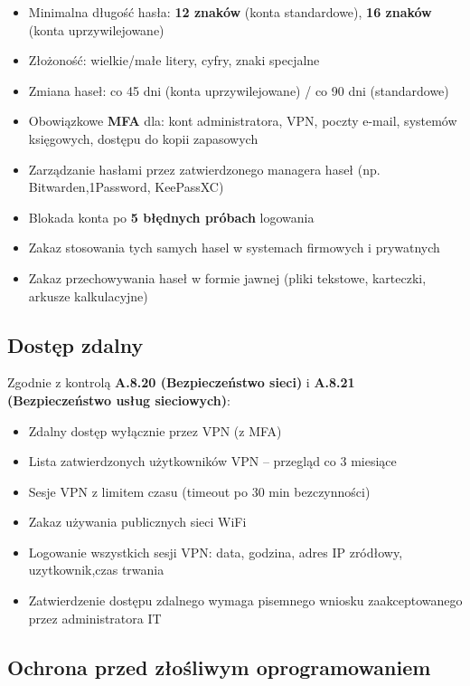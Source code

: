 \documentclass[12pt,a4paper]{article}
\providecommand{\tightlist}{\setlength{\itemsep}{0pt}\setlength{\parskip}{0pt}}
\begin{document}
\begin{itemize}
\tightlist
\item
  Minimalna długość hasła: \textbf{12 znaków} (konta standardowe), \textbf{16 znaków} (konta uprzywilejowane)
\item
  Złożoność: wielkie/małe litery, cyfry, znaki specjalne
\item
  Zmiana haseł: co 45 dni (konta uprzywilejowane) / co 90 dni
  (standardowe)
\item
  Obowiązkowe \textbf{MFA} dla: kont administratora, VPN, poczty e-mail,
  systemów księgowych, dostępu do kopii zapasowych
\item
  Zarządzanie hasłami przez zatwierdzonego managera haseł (np. Bitwarden,1Password, KeePassXC)
\item
  Blokada konta po \textbf{5 błędnych próbach} logowania
\item 
  Zakaz stosowania tych samych hasel w systemach firmowych i prywatnych
\item 
  Zakaz przechowywania haseł w formie jawnej (pliki tekstowe, karteczki, arkusze
kalkulacyjne)

\end{itemize}

\subsection{Dostęp zdalny}\label{dostux119p-zdalny}

Zgodnie z kontrolą \textbf{A.8.20 (Bezpieczeństwo sieci)} i \textbf{A.8.21 (Bezpieczeństwo usług sieciowych)}:

\begin{itemize}
\tightlist
\item
  Zdalny dostęp wyłącznie przez VPN (z MFA)
\item
  Lista zatwierdzonych użytkowników VPN -- przegląd co 3 miesiące
\item
  Sesje VPN z limitem czasu (timeout po 30 min bezczynności)
\item
  Zakaz używania publicznych sieci WiFi
\item 
  Logowanie wszystkich sesji VPN: data, godzina, adres IP zródłowy, uzytkownik,czas trwania
\item 
  Zatwierdzenie dostępu zdalnego wymaga pisemnego wniosku zaakceptowanego przez administratora IT

\end{itemize}

\subsection{Ochrona przed złośliwym
oprogramowaniem}\label{Ochrona-przed-złośliwym-oprogramowaniem}
\end{document}
